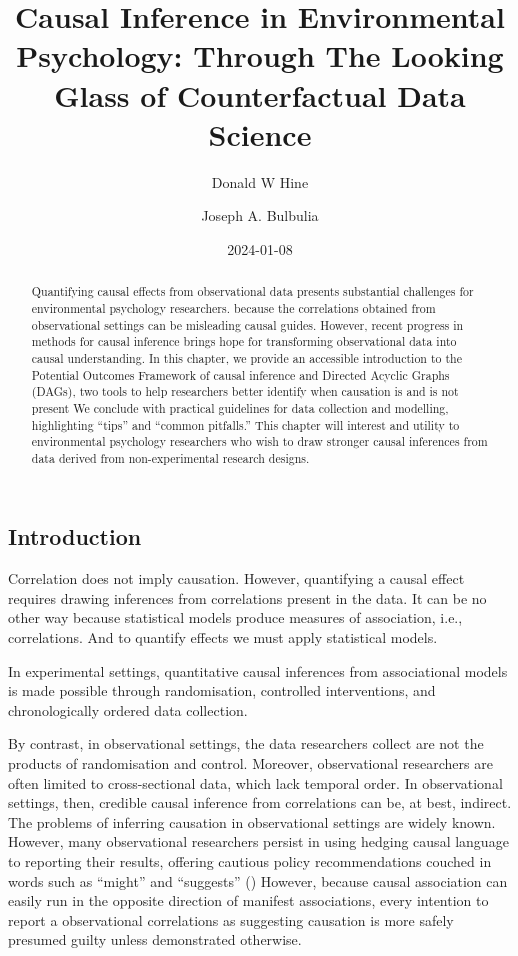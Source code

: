 \documentclass[
  singlecolumn]{article}
\title{Causal Inference in Environmental Psychology: Through The Looking
Glass of Counterfactual Data Science}
\author{Donald W Hine \and Joseph A. Bulbulia}
\date{2024-01-08}
\begin{document}
\maketitle
\begin{abstract}
Quantifying causal effects from observational data presents substantial
challenges for environmental psychology researchers. because the
correlations obtained from observational settings can be misleading
causal guides. However, recent progress in methods for causal inference
brings hope for transforming observational data into causal
understanding. In this chapter, we provide an accessible introduction to
the Potential Outcomes Framework of causal inference and Directed
Acyclic Graphs (DAGs), two tools to help researchers better identify
when causation is and is not present We conclude with practical
guidelines for data collection and modelling, highlighting ``tips'' and
``common pitfalls.'' This chapter will interest and utility to
environmental psychology researchers who wish to draw stronger causal
inferences from data derived from non-experimental research designs.
\end{abstract}
\subsection{Introduction}\label{introduction}

Correlation does not imply causation. However, quantifying a causal
effect requires drawing inferences from correlations present in the
data. It can be no other way because statistical models produce measures
of association, i.e., correlations. And to quantify effects we must
apply statistical models.

In experimental settings, quantitative causal inferences from
associational models is made possible through randomisation, controlled
interventions, and chronologically ordered data collection.

By contrast, in observational settings, the data researchers collect are
not the products of randomisation and control. Moreover, observational
researchers are often limited to cross-sectional data, which lack
temporal order. In observational settings, then, credible causal
inference from correlations can be, at best, indirect. The problems of
inferring causation in observational settings are widely known. However,
many observational researchers persist in using hedging causal language
to reporting their results, offering cautious policy recommendations
couched in words such as ``might'' and ``suggests''
() However, because causal
association can easily run in the opposite direction of manifest
associations, every intention to report a observational correlations as
suggesting causation is more safely presumed guilty unless demonstrated
otherwise.
\end{document}
